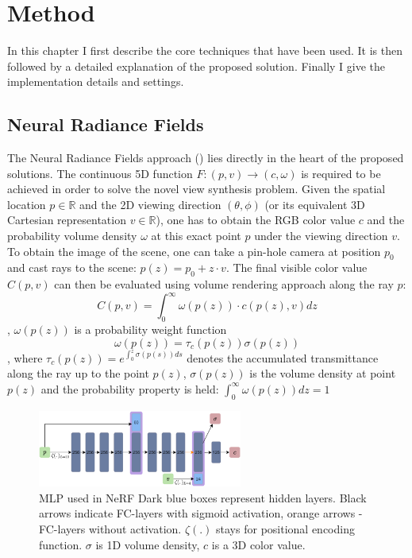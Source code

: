 \chapter{Method}
\label{chap:method}

In this chapter I first describe the core techniques that have been used.
It is then followed by a detailed explanation of the proposed solution.
Finally I give the implementation details and settings.

\section{Neural Radiance Fields}

The Neural Radiance Fields approach (\cite{mildenhall2020nerf}) lies directly in the heart of the proposed solutions.
The continuous 5D function $F : (p,v) \xrightarrow{} (c, \omega)$ is required to be achieved in order to solve the novel view synthesis problem.
Given the spatial location $p \in \mathbb{R}$ and the 2D viewing direction $(\theta, \phi)$ (or its equivalent 3D Cartesian representation $v \in \mathbb{R}$),
one has to obtain the RGB color value $c$ and the probability volume density $\omega$ at this exact point $p$ under the viewing direction $v$.
To obtain the image of the scene, one can take a pin-hole camera at position $p_0$ and cast rays to the scene: $p(z) = p_0 + z\cdot v$.
The final visible color value $C(p,v)$ can then be evaluated using volume rendering approach \cite{niemeyer2020differentiable} along the ray $p$:
\begin{equation}
    C(p,v) = \int_{0}^{\infty} \omega(p(z)) \cdot c(p(z),v) dz
    \label{eq:rendering_equation}
\end{equation}
, $\omega(p(z))$ is a probability weight function
\begin{equation}
    \omega(p(z)) = \tau_c(p(z)) \sigma(p(z))
\end{equation}
, where $\tau_c(p(z)) = e^{\int_0^z \sigma(p(s)) ds}$ denotes the accumulated transmittance along the ray up to the point $p(z)$, $\sigma(p(z))$ is the volume density at point $p(z)$ and the probability property is held: $\int_0^\infty \omega(p(z))dz = 1$

\begin{figure}[t]
    \centering
    \includegraphics[width=0.6\textwidth]{figures/mlp_nerf.png}
    \caption{MLP used in NeRF \cite{mildenhall2020nerf} Dark blue boxes represent hidden layers. Black arrows indicate FC-layers with sigmoid activation, orange arrows - FC-layers without activation. $\zeta(.)$ stays for positional encoding function. $\sigma$ is 1D volume density, $c$ is a 3D color value. }
    \label{fig:mlp_nerf}
\end{figure}

